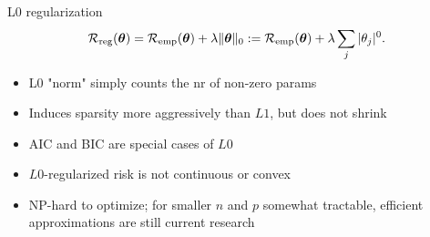 \documentclass[11pt,compress,t,notes=noshow, xcolor=table]{beamer}
\begin{document}
\begin{vbframe}{L0 regularization}
\vspace{-0.3cm}
$$
\mathcal{R}_{\text{reg}}(\bm{\theta}) = \mathcal{R}_{\text{emp}}(\bm{\theta}) + \lambda \|\bm{\theta}\|_0 := \mathcal{R}_{\text{emp}}(\bm{\theta}) + \lambda \sum_j |\theta_j|^0.
$$
\vspace{-0.3cm}
\begin{figure}
\centering
{}
\end{figure}
 

\begin{itemize}
\item L0 "norm" simply counts the nr of non-zero params
\item Induces sparsity more aggressively than $L1$, but does not shrink
\item AIC and BIC are special cases of $L0$ 
\item $L0$-regularized risk is not continuous or convex
\item NP-hard to optimize; for smaller $n$ and $p$ somewhat tractable, efficient approximations are still current research
\end{itemize}
\end{vbframe}
\end{document}

